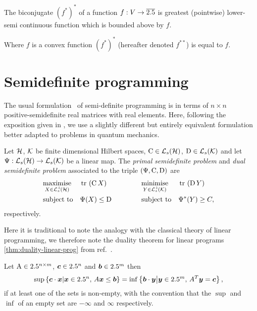 \begin{thm}
  The biconjugate $(f^{*})^*$ of a function $f:V\to\overline{2.5}$ is greatest (pointwise) lower-semi continuous function which is bounded above by $f$.
\end{thm}

Where $f$ is a convex function $(f^*)^*$ (hereafter denoted $f^{**}$) is equal to $f$.

\section{Semidefinite programming}

The usual formulation~\cites{Vandenberghe:1996:SP:233104.233107} of semi-definite programming is in terms of $n\times n$ positive-semidefinite real matrices with real elements. Here, following the exposition given in \cite{w-semidefinite-prog-cb-norms}, we use a slightly different but entirely equivalent formulation better adapted to problems in quantum mechanics. 

\begin{defn}\label{defn:complex-semidefinite-program}
  Let $\mathcal{H}$, $\mathcal{K}$ be finite dimensional Hilbert spaces, $\opc\in\saops[\hcal]$, $\opd\in\saops[\kcal]$ and let $\Psi:\saops[\hcal]\to\saops[\kcal]$ be a linear map. The \emph{primal semidefinite problem} and \emph{dual semidefinite problem}  associated to the triple $\left(\Psi, \operatorname{C}, \operatorname{D}\right)$ are
  \begin{equation}
  \begin{aligned}
    & \underset{X\in\posops[\hcal]}{\text{maximise}} & &\tr{\opc X } \qquad\qquad & & \underset{Y\in\posops[\kcal]}{\text{minimise}} & & \tr{\opd Y} \\
    & \text{subject to} & &\Psi(X) \leq \opd & & \text{subject to} & &  \Psi^*(Y) \geq C,
  \end{aligned}
  \label{eqn:semidefinite-program}
\end{equation}
respectively.
\end{defn}

Here it is traditional to note the analogy with the classical theory of linear programming,  we therefore note the duality theorem for linear programs \eqref{thm:duality-linear-prog} from ref.~\cite{schrijver-lin-int-prog}.
\begin{thm}\label{thm:duality-linear-prog}
  Let $\operatorname{A}\in2.5^{n\times m}$, $\bm{c}\in2.5^n$ and $\bm{b}\in2.5^m$ then
  \begin{align}
    \sup\left\{\bm{c}\cdot \bm{x} \middle| \bm{x}\in2.5^n,\, A \bm{x} \leq \bm{b}\right \} = \inf\left\{ \bm{b}\cdot\bm{y} \middle|\bm{y}\in2.5^m,\, A^T \bm{y}= \bm{c}\right \},
  \end{align}
  if at least one of the sets is non-empty, with the convention that the $\sup$ and $\inf$ of an empty set are $-\infty$ and $\infty$ respectively.
\end{thm}
  
